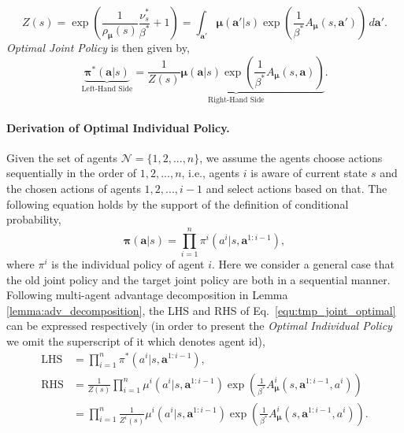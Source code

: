 \documentclass[11pt]{article}
\theoremstyle{plain}
\theoremstyle{remark}
\begin{document}
\begin{equation}
\label{equ:Z}
    Z(s) = \exp \left( \frac{1}{\rho_{\boldsymbol{\mu}}(s)} \frac{\nu_s^{*}}{\beta^{*}} + 1 \right) = \int_{\boldsymbol{a}'}\boldsymbol{\mu}(\boldsymbol{a}'|s) \exp \left( \frac{1}{\beta^{*}}A_{\boldsymbol{\mu}}(s, \boldsymbol{a}') \right)\,d\boldsymbol{a}'.
\end{equation}
\emph{Optimal Joint Policy} is then given by,
\begin{equation}
\label{equ:tmp_joint_optimal}
    \underbrace{\boldsymbol{\pi}^{*}(\boldsymbol{a}|s)}_{\text{Left-Hand Side}} = \underbrace{\frac{1}{Z(s)}\boldsymbol{\mu}(\boldsymbol{a}|s) \exp \left( \frac{1}{\beta^{*}}A_{\boldsymbol{\mu}}(s, \boldsymbol{a}) \right)}_{\text{Right-Hand Side}}.
\end{equation}

\paragraph{Derivation of Optimal Individual Policy.} Given the set of agents $\mathcal{N} = \{1, 2, ..., n\}$, we assume the agents choose actions sequentially in the order of $1, 2, ..., n$, i.e., agents $i$ is aware of current state $s$ and the chosen actions of agents $1, 2, ..., i-1$ and select actions based on that. The following equation holds by the support of the definition of conditional probability, 
\begin{equation}
    \boldsymbol{\pi}(\boldsymbol{a}|s) = \prod_{i=1}^{n}\pi^{i}(a^{i}|s, \boldsymbol{a}^{1:i-1}),
\end{equation}
where $\pi^{i}$ is the individual policy of agent $i$. Here we consider a general case that the old joint policy and the target joint policy are both in a sequential manner.
Following multi-agent advantage decomposition in Lemma \ref{lemma:adv_decomposition}, the LHS and RHS of Eq.~\eqref{equ:tmp_joint_optimal} can be expressed respectively (in order to present the \emph{Optimal Individual Policy} we omit the superscript of it which denotes agent id),
\begin{align}
    \text{LHS} &= \prod_{i=1}^{n}\pi^{*}(a^{i}|s, \boldsymbol{a}^{1:i-1}), \\
    \text{RHS} &= \frac{1}{Z(s)} \prod_{i=1}^{n}\mu^{i}(a^{i}|s, \boldsymbol{a}^{1:i-1})\exp \left( \frac{1}{\beta^{*}}A_{\boldsymbol{\mu}}^{i}(s, \boldsymbol{a}^{1:i-1}, a^i) \right) \nonumber \\
    &= \prod_{i=1}^{n} \frac{1}{Z^{i}(s)} \mu^{i}(a^{i}|s, \boldsymbol{a}^{1:i-1})\exp \left( \frac{1}{\beta^{*}}A_{\boldsymbol{\mu}}^{i}(s, \boldsymbol{a}^{1:i-1}, a^i) \right). \label{equ:individual_with_Z_i}
\end{align}
\end{document}
